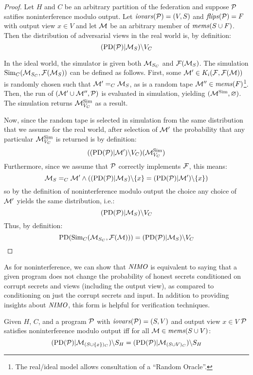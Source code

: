 \begin{proof}
  Let $H$ and $C$ be an arbitrary partition of the federation and
  suppose $\mathcal{P}$ satifies noninterference modulo output. Let
  $\mathit{iovars}(\mathcal{P}) = (V,S)$ and $\mathit{flips}(\mathcal{P}) = F$ with output view $x
  \in V$ and let $\mathcal{M}$ be an arbitrary member of $\mathit{mems}(S \cup
  F)$. Then the distribution of adversarial views in the real world
  is, by definition:
  $$(\mathrm{PD}(\mathcal{P})|\mathcal{M}_S)\backslash V_C$$

  In the ideal world, the simulator is given both $\mathcal{M}_{S_C}$ and
  $\mathcal{F}(\mathcal{M}_S)$.  The simulation $\mathrm{Sim}_C(\mathcal{M}_{S_C},
  \mathcal{F}(\mathcal{M}_S))$ can be defined as follows. First, some $\mathcal{M}'
  \in K_i(\mathcal{F},\mathcal{F}(\mathcal{M}))$ is randomly chosen such that
  $\mathcal{M}' =_C \mathcal{M}_S$, as is a random tape $\mathcal{M}'' \in
  \mathit{mems}(F)$\footnote{The real/ideal model allows consultation of a
  ``Random Oracle''.}. Then, the run of $(\mathcal{M}' \cup \mathcal{M}'',
  \mathcal{P})$ is evaluated in simulation, yielding $(\mathcal{M}^{\mathrm{Sim}},\varnothing)$.
  The simulation returns $\mathcal{M}^{\mathrm{Sim}}_{V_C}$ as a result.

  Now, since the random tape is selected in simulation from the same distribution
  that we assume for the real world, after selection of $\mathcal{M}'$ the
  probability that any particular $\mathcal{M}^{\mathrm{Sim}}_{V_C}$ is returned is by definition:
  $$
   ((\mathrm{PD}(\mathcal{P})|\mathcal{M}')\backslash V_C)(\mathcal{M}^{\mathrm{Sim}}_{V_C})
  $$
  Furthermore, since we assume that $\mathcal{P}$ correctly implements $\mathcal{F}$, this
  means:
  $$
  \mathcal{M}_S =_C \mathcal{M}' \wedge
     ((\mathrm{PD}(\mathcal{P})|\mathcal{M}_S)\backslash\{ x \} =
      (\mathrm{PD}(\mathcal{P})|\mathcal{M}')\backslash\{ x \})
  $$
  so by the definition of noninterference modulo output the choice
  any choice of $\mathcal{M}'$ yields the same distribution, i.e.:
  $$(\mathrm{PD}(\mathcal{P})|\mathcal{M}_S)\backslash V_C$$
  Thus, by definition:
  $$
   \mathrm{PD}(\mathrm{Sim}_C(\mathcal{M}_{S_C},\mathcal{F}(\mathcal{M}))) = (\mathrm{PD}(\mathcal{P})|\mathcal{M}_S)\backslash V_C
  $$
\end{proof}

As for noninterference, we can show that $\mathit{NIMO}$ is equivalent
to saying that a given program does not change the probability
of honest secrets conditioned on corrupt secrets and views
(including the output view), as compared to conditioning on
just the corrupt secrets and input. In addition to providing
insights about $\mathit{NIMO}$, this form is helpful for
verification techniques. 
\begin{lemma}
  Given $H$, $C$, and a program $\mathcal{P}$ with $\mathit{iovars}(\mathcal{P}) = (S,V)$ and
  output view $x \in V$
  $\mathcal{P}$ satisfies noninterference modulo output iff for all
  $\mathcal{M} \in \mathit{mems}(S \cup V)$:
  $$(\mathrm{PD}(\mathcal{P})|\mathcal{M}_{(S \cup \{x\})_C})\backslash S_H =
    (\mathrm{PD}(\mathcal{P})|\mathcal{M}_{(S\cup V)_C})\backslash S_H $$
\end{lemma}
